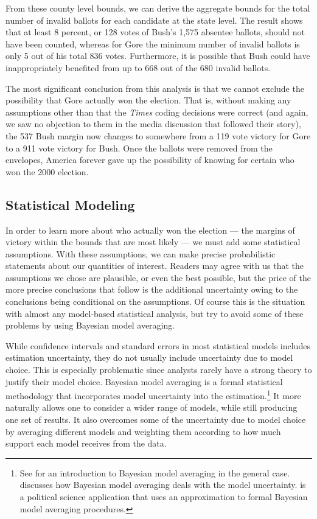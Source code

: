 \documentclass[11pt,titlepage]{article}
\begin{document}
From these county level bounds, we can derive the aggregate bounds for
the total number of invalid ballots for each candidate at the state
level. The result shows that at least 8 percent, or 128 votes of
Bush's 1,575 absentee ballots, should not have been counted, whereas
for Gore the minimum number of invalid ballots is only 5 out of his
total 836 votes.  Furthermore, it is possible that Bush could have
inappropriately benefited from up to 668 out of the 680 invalid
ballots.

The most significant conclusion from this analysis is that we cannot
exclude the possibility that Gore actually won the election.  That is,
without making any assumptions other than that the \emph{Times} coding
decisions were correct (and again, we saw no objection to them in the
media discussion that followed their story), the 537 Bush margin now
changes to somewhere from a 119 vote victory for Gore to a 911 vote
victory for Bush.  Once the ballots were removed from the envelopes,
America forever gave up the possibility of knowing for certain who won
the 2000 election.

\subsection{Statistical Modeling} \label{s:stat}

In order to learn more about who actually won the election --- the
margins of victory within the bounds that are most likely --- we must
add some statistical assumptions.  With these assumptions, we can make
precise probabilistic statements about our quantities of interest.
Readers may agree with us that the assumptions we chose are plausible,
or even the best possible, but the price of the more precise
conclusions that follow is the additional uncertainty owing to the
conclusions being conditional on the assumptions.  Of course this is
the situation with almost any model-based statistical analysis, but
try to avoid some of these problems by using Bayesian model averaging.

While confidence intervals and standard errors in most statistical
models includes estimation uncertainty, they do not usually include
uncertainty due to model choice.  This is especially problematic since
analysts rarely have a strong theory to justify their model choice.
Bayesian model averaging is a formal statistical methodology that
incorporates model uncertainty into the estimation.\footnote{See
  \citet{hoet:madi:raft:voli:99} for an introduction to Bayesian model
  averaging in the general case.  \citet{drap:95} discusses how
  Bayesian model averaging deals with the model uncertainty.
  \citet{bart:97} is a political science application that uses an
  approximation to formal Bayesian model averaging procedures.} It
more naturally allows one to consider a wider range of models, while
still producing one set of results.  It also overcomes some of the
uncertainty due to model choice by averaging different models and
weighting them according to how much support each model receives from
the data.
\end{document}
